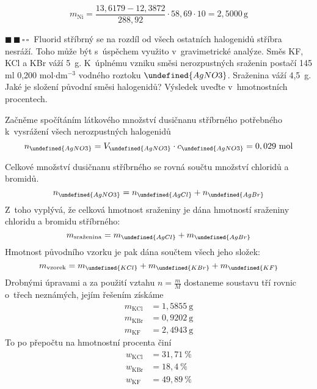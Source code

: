\documentclass{book}
\let\ch\undefined
\newcommand{\dva}{$\blacksquare \, \blacksquare \, \square \, \square \; \; $}
\renewenvironment{quotation}{\par}{\par} %
\begin{document}
\[
m_{\mathrm{Ni}}=\frac{13,6179-12,3872}{288,92}\cdot58,69\cdot10=2,5000\,\mathrm{g}
\]


\hrulefill %
\begin{quotation}
\dva Fluorid stříbrný se na rozdíl od všech ostatních halogenidů stříbra
nesráží. Toho může být s~úspěchem využito v~gravimetrické analýze.
Směs KF, KCl a KBr váží 5~g. K~úplnému vzniku směsi nerozpustných
sraženin postačí 145 ml 0,200 mol$\cdot$dm$^{-3}$ vodného roztoku
$\ch{AgNO3}$. Sraženina váží 4,5~g. Jaké je složení původní směsi
halogenidů? Výsledek uveďte v~hmotnostních procentech.
\end{quotation} \dotfill \par 
Začněme spočítáním látkového množství dusičnanu stříbrného potřebného
k~vysrážení všech nerozpustných halogenidů 
\[
n_{\ch{AgNO3}}=V_{\ch{AgNO3}}\cdot c_{\ch{AgNO3}}=0,029\mathrm{~mol}
\]

Celkové množství dusičnanu stříbrného se rovná součtu množství chloridů
a bromidů. 
\[
n_{\ch{AgNO3}}=n_{\ch{AgCl}}+n_{\ch{AgBr}}
\]
Z~toho vyplývá, že celková hmotnost sraženiny je dána hmotností sraženiny
chloridu a bromidu stříbrného: 
\[
m_{\text{sraženina}}=m_{\ch{AgCl}}+m_{\ch{AgBr}}
\]
Hmotnost původního vzorku je pak dána součtem všech jeho složek: 
\[
m_{\text{vzorek}}=m_{\ch{KCl}}+m_{\ch{KBr}}+m_{\ch{KF}}
\]
Drobnými úpravami a za použití vztahu $n=\frac{m}{M}$ dostaneme soustavu
tří rovnic o~třech neznámých, jejím řešením získáme 
\begin{align*}
m_{\mathrm{KCl}} & =1,5855\mathrm{~g}\\
m_{\mathrm{KBr}} & =0,9202\mathrm{~g}\\
m_{\mathrm{KF}} & =2,4943\mathrm{~g}
\end{align*}
To po přepočtu na hmotnostní procenta činí 
\begin{align*}
w_{\mathrm{KCl}} & =31,71\ \%\\
w_{\mathrm{KBr}} & =18,4\ \%\\
w_{\mathrm{KF}} & =49,89\ \%
\end{align*}
\end{document}
